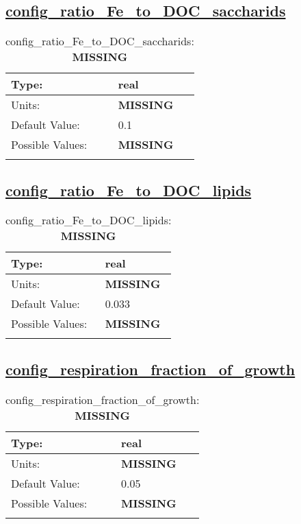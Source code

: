 \subsection[config\_ratio\_Fe\_to\_DOC\_saccharids]{\hyperref[sec:nm_tab_biogeochemistry]{config\_ratio\_Fe\_to\_DOC\_saccharids}}
\label{subsec:nm_sec_config_ratio_Fe_to_DOC_saccharids}
\begin{center}
\begin{longtable}{| p{2.0in} || p{4.0in} |}
    \hline
    Type: & real \\
    \hline
    Units: & {\bf \color{red} MISSING} \\
    \hline
    Default Value: & 0.1 \\
    \hline
    Possible Values: & {\bf \color{red} MISSING} \\
    \hline
    \caption{config\_ratio\_Fe\_to\_DOC\_saccharids: {\bf \color{red} MISSING}}
\end{longtable}
\end{center}
\subsection[config\_ratio\_Fe\_to\_DOC\_lipids]{\hyperref[sec:nm_tab_biogeochemistry]{config\_ratio\_Fe\_to\_DOC\_lipids}}
\label{subsec:nm_sec_config_ratio_Fe_to_DOC_lipids}
\begin{center}
\begin{longtable}{| p{2.0in} || p{4.0in} |}
    \hline
    Type: & real \\
    \hline
    Units: & {\bf \color{red} MISSING} \\
    \hline
    Default Value: & 0.033 \\
    \hline
    Possible Values: & {\bf \color{red} MISSING} \\
    \hline
    \caption{config\_ratio\_Fe\_to\_DOC\_lipids: {\bf \color{red} MISSING}}
\end{longtable}
\end{center}
\subsection[config\_respiration\_fraction\_of\_growth]{\hyperref[sec:nm_tab_biogeochemistry]{config\_respiration\_fraction\_of\_growth}}
\label{subsec:nm_sec_config_respiration_fraction_of_growth}
\begin{center}
\begin{longtable}{| p{2.0in} || p{4.0in} |}
    \hline
    Type: & real \\
    \hline
    Units: & {\bf \color{red} MISSING} \\
    \hline
    Default Value: & 0.05 \\
    \hline
    Possible Values: & {\bf \color{red} MISSING} \\
    \hline
    \caption{config\_respiration\_fraction\_of\_growth: {\bf \color{red} MISSING}}
\end{longtable}
\end{center}
